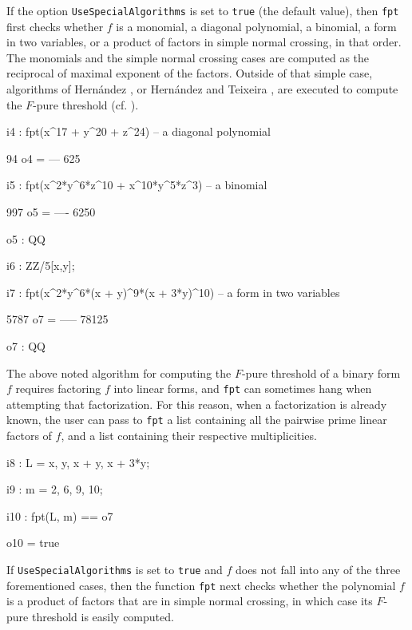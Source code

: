 \documentclass{amsart}
\begin{document}
If the option {\tt UseSpecialAlgorithms} is set to {\tt true} (the default value), then {\tt fpt} first checks whether $f$ is a monomial, a diagonal polynomial, a binomial, a form in two variables, or a product of factors in simple normal crossing, in that order.  The monomials and the simple normal crossing cases are computed as the reciprocal of maximal exponent of the factors.
Outside of that simple case, algorithms of Hern\'andez \cite{HernandezFInvariantsOfDiagonalHyp, HernandezFPureThresholdOfBinomial}, or Hern\'andez and Teixeira \cite{HernandezTeixeiraFThresholdFunctions},  are executed to compute the $F$-pure threshold (cf. \cite{ShibutaTakagiLCThresholds}).

{\small
{}
\begin{MyVerbatim}

i4 : fpt(x^17 + y^20 + z^24) -- a diagonal polynomial

      94
o4 = ---
     625

i5 : fpt(x^2*y^6*z^10 + x^10*y^5*z^3) -- a binomial

      997
o5 = ----
     6250

o5 : QQ

i6 : ZZ/5[x,y];

i7 : fpt(x^2*y^6*(x + y)^9*(x + 3*y)^10) -- a form in two variables

      5787
o7 = -----
     78125

o7 : QQ
\end{MyVerbatim}
}
\medspace

The above noted algorithm for computing the $F$-pure threshold of a binary form $f$ requires factoring $f$ into linear forms, and {\tt fpt} can sometimes hang when attempting that factorization. For this reason, when a factorization is already known, the user can pass to {\tt fpt} a list containing all the pairwise prime linear factors of $f$, and a list containing their respective multiplicities.

{\small
{}
\begin{MyVerbatim}

i8 : L = {x, y, x + y, x + 3*y};

i9 : m = {2, 6, 9, 10};

i10 : fpt(L, m) == o7

o10 = true
\end{MyVerbatim}
}
\medspace

If {\tt UseSpecialAlgorithms} is set to {\tt true} and $f$ does not fall into any of the three forementioned cases, then the function {\tt fpt} next checks whether the polynomial $f$ is a product of factors that are in simple normal crossing, in which case its $F$-pure threshold is easily computed.
\end{document}
